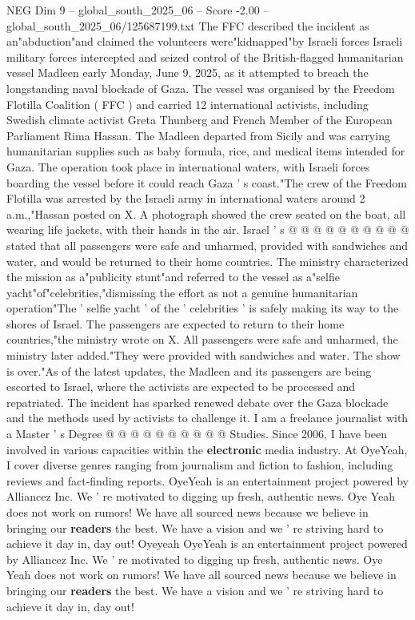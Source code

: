 \begin{textsample}{NEG Dim 9 – global\_south\_2025\_06 – Score -2.00 – global\_south\_2025\_06/125687199.txt}  \label{ex:f9_neg_284}
The FFC described the incident as an"abduction"and claimed the volunteers were"kidnapped"by Israeli forces Israeli military forces intercepted and seized control of the British-flagged humanitarian vessel Madleen early Monday, June 9, 2025, as it attempted to breach the longstanding naval blockade of Gaza.
The vessel was organised by the Freedom Flotilla Coalition ( FFC ) and carried 12 international activists, including Swedish climate activist Greta Thunberg and French Member of the European Parliament Rima Hassan.
The Madleen departed from Sicily and was carrying humanitarian supplies such as baby formula, rice, and medical items intended for Gaza.
The operation took place in international waters, with Israeli forces boarding the vessel before it could reach Gaza ' s coast."The crew of the Freedom Flotilla was arrested by the Israeli army in international waters around 2 a.m.,"Hassan posted on X.
A photograph showed the crew seated on the boat, all wearing life jackets, with their hands in the air.
Israel ' s @ @ @ @ @ @ @ @ @ @ stated that all passengers were safe and unharmed, provided with sandwiches and water, and would be returned to their home countries.
The ministry characterized the mission as a"publicity stunt"and referred to the vessel as a"selfie yacht"of"celebrities,"dismissing the effort as not a genuine humanitarian operation"The ' selfie yacht ' of the ' celebrities ' is safely making its way to the shores of Israel.
The passengers are expected to return to their home countries,"the ministry wrote on X.
All passengers were safe and unharmed, the ministry later added."They were provided with sandwiches and water.
The show is over."As of the latest updates, the Madleen and its passengers are being escorted to Israel, where the activists are expected to be processed and repatriated.
The incident has sparked renewed debate over the Gaza blockade and the methods used by activists to challenge it.
I am a freelance journalist with a Master ' s Degree @ @ @ @ @ @ @ @ @ @ Studies.
Since 2006, I have been involved in various capacities within the \textbf{electronic} media industry.
At OyeYeah, I cover diverse genres ranging from journalism and fiction to fashion, including reviews and fact-finding reports.
OyeYeah is an entertainment project powered by Alliancez Inc.
We ' re motivated to digging up fresh, authentic news.
Oye Yeah does not work on rumors!
We have all sourced news because we believe in bringing our \textbf{readers} the best.
We have a vision and we ' re striving hard to achieve it day in, day out!
Oyeyeah OyeYeah is an entertainment project powered by Alliancez Inc.
We ' re motivated to digging up fresh, authentic news.
Oye Yeah does not work on rumors!
We have all sourced news because we believe in bringing our \textbf{readers} the best.
We have a vision and we ' re striving hard to achieve it day in, day out!

\end{textsample}
